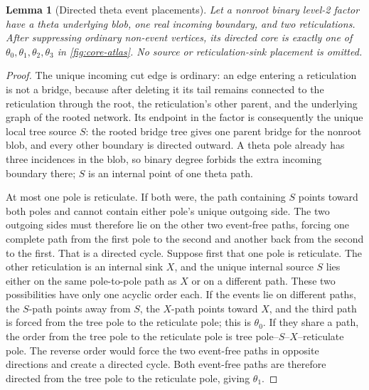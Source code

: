 \documentclass[11pt]{article}
\newtheorem{lemma}[theorem]{Lemma}
\theoremstyle{remark}
\begin{document}
\begin{lemma}[Directed theta event placements]\label{lem:theta-events}
Let a nonroot binary level-2 factor have a theta underlying blob, one real
incoming boundary, and two reticulations.  After suppressing ordinary
non-event vertices, its directed core is exactly one of
$\theta_0,\theta_1,\theta_2,\theta_3$ in \cref{fig:core-atlas}.  No source or
reticulation-sink placement is omitted.
\end{lemma}

\begin{proof}
The unique incoming cut edge is ordinary: an edge entering a reticulation
is not a bridge, because after deleting it its tail remains connected to the
reticulation through the root, the reticulation's other parent, and the
underlying graph of the rooted network.  Its endpoint in the factor is
consequently the unique local tree source $S$: the rooted bridge tree gives
one parent bridge for the nonroot blob, and every other boundary is directed
outward.  A theta pole already has three incidences in the blob, so binary
degree forbids the extra incoming boundary there; $S$ is an internal point
of one theta path.

At most one pole is reticulate.  If both were, the path containing $S$ points
toward both poles and cannot contain either pole's unique outgoing side.  The
two outgoing sides must therefore lie on the other two event-free paths,
forcing one complete path from the first pole to the second and another back
from the second to the first.  That is a directed cycle.  Suppose first that
one pole is reticulate.  The other reticulation is
an internal sink $X$, and the unique internal source $S$ lies either on the
same pole-to-pole path as $X$ or on a different path.  These two possibilities
have only one acyclic order each.  If the events lie on different paths, the
$S$-path points away from $S$, the $X$-path points toward $X$, and the third
path is forced from the tree pole to the reticulate pole; this is
$\theta_0$.  If they share a path, the order from the tree pole to the
reticulate pole is tree pole--$S$--$X$--reticulate pole.  The reverse order
would force the two event-free paths in opposite directions and create a
directed cycle.  Both event-free paths are therefore directed from the tree
pole to the reticulate pole, giving $\theta_1$.


\end{proof}
\end{document}
